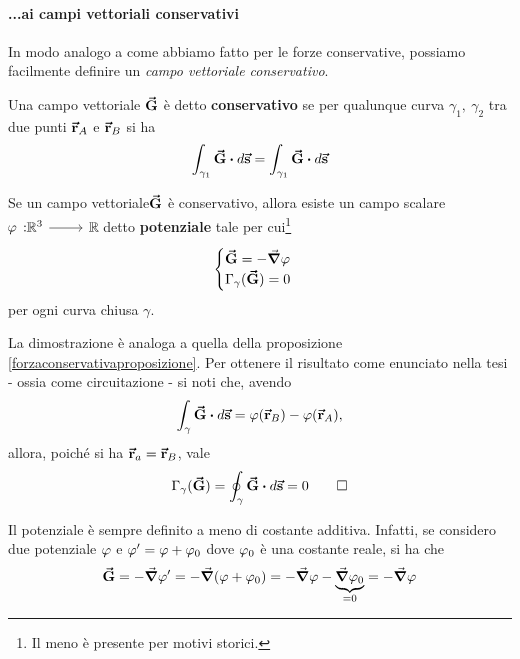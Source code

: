 \paragraph{...ai campi vettoriali conservativi}
In modo analogo a come abbiamo fatto per le forze conservative, possiamo facilmente definire un \textit{campo vettoriale conservativo}.
\begin{define}
	Una campo vettoriale $\vb*{\va{G}}$ è detto \textbf{conservativo} se per qualunque curva $\gamma_1,\ \gamma_2$ tra due punti $\vb*{\va{r}}_A$ e $\vb*{\va{r}}_B$ si ha
	\begin{equation}
		\int_{\gamma_1}\vba{G}\vdot d\vba{s}=\int_{\gamma_1}\vba{G}\vdot d\vba{s}
	\end{equation}
\end{define}
\begin{proposition}\label{campivettorialiconservativiproposizione}
	Se un campo vettoriale$\vb*{\va{G}}$ è conservativo, allora esiste un campo scalare $\funz[\oldphi]{\realset^3}{\realset}$ detto \textbf{potenziale} tale per cui\footnote{Il meno è presente per motivi storici.}
	\begin{equation}
		\begin{cases}
			\vba{G}=-\grad{\oldphi}\\
			\Gamma_{\gamma}(\vba{G})=0
		\end{cases}
	\end{equation}
per ogni curva chiusa $\gamma$.
\end{proposition}
\begin{demonstration}
	La dimostrazione è analoga a quella della proposizione \ref{forzaconservativaproposizione}. Per ottenere il risultato come enunciato nella tesi - ossia come circuitazione - si noti che, avendo
	\begin{equation*}
		\int_{\gamma}\vba{G}\vdot d\vba{s}=\oldphi(\vba{r}_B)-\oldphi(\vba{r}_A),
	\end{equation*}
	allora, poiché si ha $\vb*{\va{r}}_a=\vb*{\va{r}}_B$, vale
	\begin{equation*}
		\Gamma_{\gamma}(\vba{G})=\oint_{\gamma}\vba{G}\vdot d\vba{s}=0\qedhere
	\end{equation*}
\end{demonstration}
\begin{observe}
	Il potenziale è sempre definito a meno di costante additiva. Infatti, se considero due potenziale $\oldphi$ e $\oldphi'=\oldphi+\oldphi_0$ dove $\oldphi_0$ è una costante reale, si ha che
	\begin{equation*}
		\vba{G}=-\grad{\oldphi'}=-\grad{(\oldphi+\oldphi_0)}=-\grad{\oldphi}-\underbrace{\grad{\oldphi_0}}_{=0}=-\grad{\oldphi}
	\end{equation*}
\end{observe}
